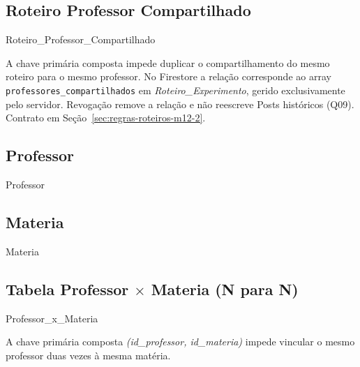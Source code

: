 \subsection{Roteiro Professor Compartilhado}
\begin{entidade}{Roteiro\_Professor\_Compartilhado}
\end{entidade}
\begin{explicacao}
A chave primária composta impede duplicar o compartilhamento do mesmo roteiro
para o mesmo professor. No Firestore a relação corresponde ao array
\texttt{professores\_compartilhados} em \textit{Roteiro\_Experimento}, gerido
exclusivamente pelo servidor. Revogação remove a relação e não reescreve Posts
históricos (Q09). Contrato em
Seção~\ref{sec:regras-roteiros-m12-2}.
\end{explicacao}

\subsection{Professor}
\begin{entidade}{Professor}
\end{entidade}

\subsection{Materia}
\begin{entidade}{Materia}
\end{entidade}

\subsection{Tabela Professor \texorpdfstring{$\times$}{x} Materia (N para N)}
\begin{entidade}{Professor\_x\_Materia}
\end{entidade}
\begin{regra}
A chave primária composta \textit{(id\_professor, id\_materia)} impede vincular o mesmo professor duas vezes à mesma matéria.
\end{regra}

